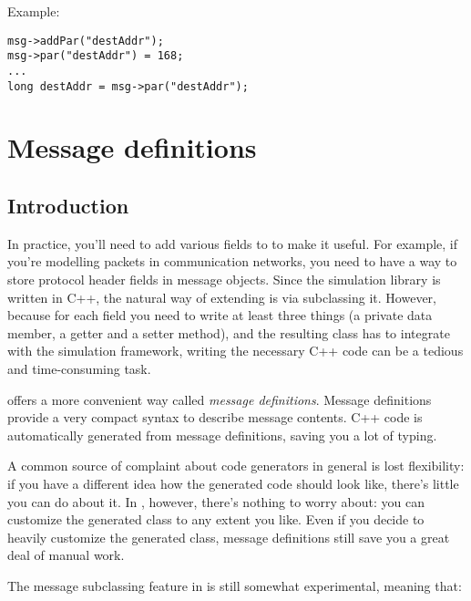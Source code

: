 Example:

\begin{verbatim}
msg->addPar("destAddr");
msg->par("destAddr") = 168;
...
long destAddr = msg->par("destAddr");
\end{verbatim}



\section{Message definitions}
\label{ch:messages:message-definitions}

\subsection{Introduction}

In practice, you'll need to add various fields to  to
make it useful. For example, if you're modelling packets in communication
networks, you need to have a way to store protocol header fields in message
objects. Since the simulation library is written in C++, the natural way
of extending  is via subclassing it.
However, because for each field you need to write at least
three things (a private data member, a getter and a setter method),
and the resulting class has to integrate with the simulation framework,
writing the necessary C++ code can be a tedious and time-consuming task.

{\opp} offers a more convenient way called \textit{message definitions}.
Message definitions provide a very compact syntax to describe
message contents. C++ code is automatically generated from message
definitions, saving you a lot of typing.

A common source of complaint about code generators in general is
lost flexibility: if you have a different idea how the generated
code should look like, there's little you can do about it.
In {\opp}, however, there's nothing to worry about: you can
customize the generated class to any extent you like.
Even if you decide to heavily customize the generated class,
message definitions still save you a great deal of manual work.

The message subclassing feature in {\opp} is still somewhat experimental,
meaning that:

